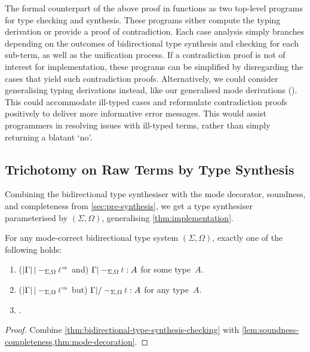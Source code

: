 The formal counterpart of the above proof in \Agda functions as two top-level programs for type checking and synthesis.
These programs either compute the typing derivation or provide a proof of contradiction.
Each case analysis simply branches depending on the outcomes of bidirectional type synthesis and checking for each sub-term, as well as the unification process.
If a contradiction proof is not of interest for implementation, these programs can be simplified by disregarding the cases that yield such contradiction proofs.
Alternatively, we could consider generalising typing derivations instead, like our generalised mode derivations ().
This could accommodate ill-typed cases and reformulate contradiction proofs positively to deliver more informative error messages.
This would assist programmers in resolving issues with ill-typed terms, rather than simply returning a blatant `no'.

\subsection{Trichotomy on Raw Terms by Type Synthesis} \label{subsec:trichotomy}

Combining the bidirectional type synthesiser with the mode decorator, soundness, and completeness from \cref{sec:pre-synthesis}, we get a type synthesiser parameterised by $(\Sigma, \Omega)$, generalising \cref{thm:implementation}.

\begin{corollary}\label{cor:trichotomy}
  For any mode-correct bidirectional type system $(\Sigma, \Omega)$, 
  exactly one of the following holds:
  \begin{enumerate}
    \item (\/$\erase{\Gamma} |-_{\Sigma, \Omega} \isTerm{t}^{\syn}$ and)\/ $\Gamma |-_{\Sigma, \Omega} \isTerm{t} : A$ for some type~$A$.
    \item (\/$\erase{\Gamma} |-_{\Sigma, \Omega} \isTerm{t}^{\syn}$ but)\/ $\Gamma |/-_{\Sigma, \Omega} \isTerm{t} : A$ for any type~$A$.
    \item {}.
  \end{enumerate}
\end{corollary}
\begin{proof}
  Combine \cref{thm:bidirectional-type-synthesis-checking} with \cref{lem:soundness-completeness,thm:mode-decoration}.
\end{proof}
